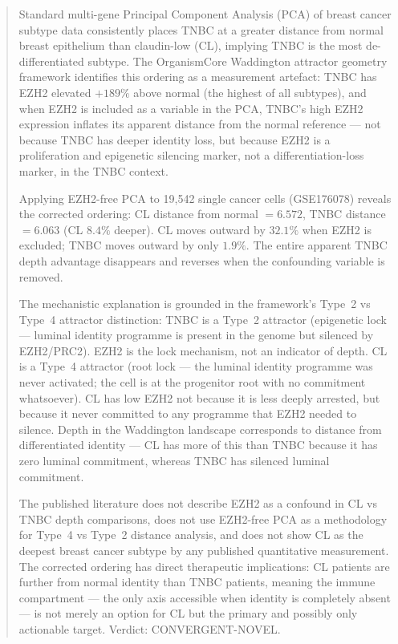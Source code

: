 \documentclass[12pt, a4paper]{article}
\begin{document}
\vspace{0.8em}

\begin{abstract}
\noindent
Standard multi-gene Principal Component Analysis
(PCA) of breast cancer subtype data consistently
places TNBC at a greater distance from normal
breast epithelium than claudin-low (CL), implying
TNBC is the most de-differentiated subtype. The
OrganismCore Waddington attractor geometry
framework identifies this ordering as a measurement
artefact: TNBC has EZH2 elevated $+189\%$ above
normal (the highest of all subtypes), and when
EZH2 is included as a variable in the PCA, TNBC's
high EZH2 expression inflates its apparent distance
from the normal reference --- not because TNBC has
deeper identity loss, but because EZH2 is a
proliferation and epigenetic silencing marker,
not a differentiation-loss marker, in the TNBC
context.

Applying EZH2-free PCA to 19,542 single cancer
cells (GSE176078) reveals the corrected ordering:
CL distance from normal $= 6.572$, TNBC distance
$= 6.063$ (CL $8.4\%$ deeper). CL moves outward
by $32.1\%$ when EZH2 is excluded; TNBC moves
outward by only $1.9\%$. The entire apparent
TNBC depth advantage disappears and reverses
when the confounding variable is removed.

The mechanistic explanation is grounded in the
framework's Type~2 vs Type~4 attractor distinction:
TNBC is a Type~2 attractor (epigenetic lock ---
luminal identity programme is present in the
genome but silenced by EZH2/PRC2). EZH2 is the
lock mechanism, not an indicator of depth.
CL is a Type~4 attractor (root lock --- the luminal
identity programme was never activated; the cell
is at the progenitor root with no commitment
whatsoever). CL has low EZH2 not because it is
less deeply arrested, but because it never
committed to any programme that EZH2 needed to
silence. Depth in the Waddington landscape
corresponds to distance from differentiated
identity --- CL has more of this than TNBC
because it has zero luminal commitment, whereas
TNBC has silenced luminal commitment.

The published literature does not describe EZH2
as a confound in CL vs TNBC depth comparisons,
does not use EZH2-free PCA as a methodology for
Type~4 vs Type~2 distance analysis, and does not
show CL as the deepest breast cancer subtype by
any published quantitative measurement. The
corrected ordering has direct therapeutic
implications: CL patients are further from
normal identity than TNBC patients, meaning the
immune compartment --- the only axis accessible
when identity is completely absent --- is not
merely an option for CL but the primary and
possibly only actionable target.
Verdict: CONVERGENT-NOVEL.
\end{abstract}
\end{document}
